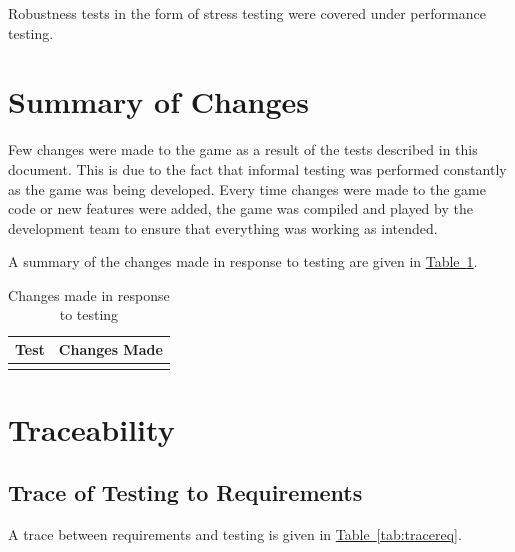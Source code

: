 \documentclass[12pt, titlepage]{article}
\begin{document}
Robustness tests in the form of stress testing were covered under performance testing.

\section{Summary of Changes}
Few changes were made to the game as a result of the tests described in this document.  This is due to the fact that informal testing was performed constantly as the game was being developed.  Every time changes were made to the game code or new features were added, the game was compiled and played by the development team to ensure that everything was working as intended.

A summary of the changes made in response to testing are given in \hyperref[tab:changes]{Table~\ref*{tab:changes}}.\\

\begin{table}[ht]
\caption{Changes made in response to testing} \label{tab:changes}
\begin{tabularx}{\textwidth}{p{5cm}X}
\toprule {\bf Test} & {\bf Changes Made}\\
\midrule
\\
\bottomrule
\end{tabularx}
\end{table}

\section{Traceability}
\subsection{Trace of Testing to Requirements}
A trace between requirements and testing is given in \hyperref[tab:tracereq]{Table~\ref*{tab:tracereq}}.\\
\end{document}
